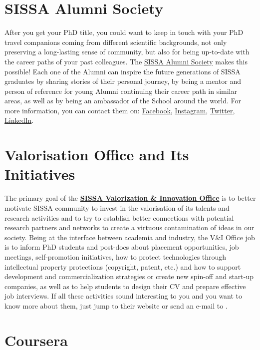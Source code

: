 \documentclass{sissavademecum}
\begin{document}
\section{SISSA Alumni Society}

After you get your PhD title, you could want to keep in touch with your PhD travel companions coming from different scientific backgrounds, not only preserving a long-lasting sense of community, but also for being up-to-date with the career paths of your past colleagues. The \href{https://alumni.sissa.it}{SISSA Alumni Society} makes this possible! Each one of the Alumni can inspire the future generations of SISSA graduates by sharing stories of their personal journey, by being a mentor and person of reference for young Alumni continuing their career path in similar areas, as well as by being an ambassador of the School around the world. 
For more information, you can contact them on: \href{https://www.facebook.com/SISSAAlumniSociety/}{Facebook}, \href{https://www.instagram.com/sissaalumni/}{Instagram}, \href{https://twitter.com/AlumniSissa}{Twitter}, \href{https://www.linkedin.com/groups/1761097/}{LinkedIn}.


\section{Valorisation Office and Its Initiatives}

The primary goal of the \href{https://www.valorisation.sissa.it/}{\textbf{SISSA Valorization \& Innovation Office}} is to better motivate SISSA community to invest in the valorisation of its talents and research activities and to try to establish better connections with potential research partners and networks to create a virtuous contamination of ideas in our society. Being at the interface between academia and industry, the V\&I Office job is to inform PhD students and post-docs about placement opportunities, job meetings, self-promotion initiatives, how to protect technologies through intellectual property protections (copyright, patent, etc.) and how to support development and commercialization strategies or create new spin-off and start-up companies, as well as to help students to design their CV and prepare effective job interviews. If all these activities sound interesting to you and you want to know more about them, just jump to their website or send an e-mail to .


\section{Coursera}
\end{document}

